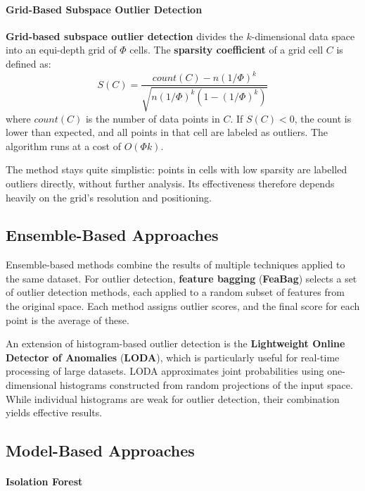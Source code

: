 \paragraph{Grid-Based Subspace Outlier Detection}
\textbf{Grid-based subspace outlier detection} divides the $k$-dimensional data space into an equi-depth grid of $\Phi$ cells. The \textbf{sparsity coefficient} of a grid cell $C$ is defined as:
\begin{equation}
    S(C) = \dfrac{\textit{count}(C) - n (1/ \Phi)^k}{\sqrt{n(1/\Phi)^k (1-(1/\Phi)^k)}}
\end{equation}
where $\textit{count}(C)$ is the number of data points in $C$. If $S(C) < 0$, the count is lower than expected, and all points in that cell are labeled as outliers. The algorithm runs at a cost of $O(\Phi k)$.

The method stays quite simplistic: points in cells with low sparsity are labelled outliers directly, without further analysis. Its effectiveness therefore depends heavily on the grid's resolution and positioning.

\subsection{Ensemble-Based Approaches}

Ensemble-based methods combine the results of multiple techniques applied to the same dataset. For outlier detection, \textbf{feature bagging} (\textbf{FeaBag}) selects a set of outlier detection methods, each applied to a random subset of features from the original space. Each method assigns outlier scores, and the final score for each point is the average of these.

An extension of histogram-based outlier detection is the \textbf{Lightweight Online Detector of Anomalies} (\textbf{LODA}), which is particularly useful for real-time processing of large datasets. LODA approximates joint probabilities using one-dimensional histograms constructed from random projections of the input space. While individual histograms are weak for outlier detection, their combination yields effective results.


\subsection{Model-Based Approaches}
\paragraph{Isolation Forest}

